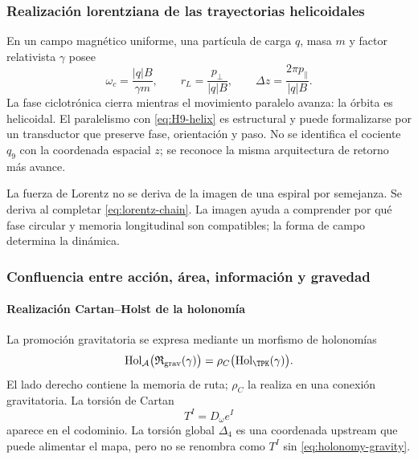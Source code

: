 \subsubsection{Realización lorentziana de las trayectorias helicoidales}

En un campo magnético uniforme, una partícula de carga \(q\), masa \(m\) y
factor relativista \(\gamma\) posee
\begin{equation}
\omega_c=\frac{|q|B}{\gamma m},
\qquad
r_L=\frac{p_\perp}{|q|B},
\qquad
\Delta z=\frac{2\pi p_\parallel}{|q|B}.
\label{eq:lorentz-helix}
\end{equation}
La fase ciclotrónica cierra mientras el movimiento paralelo avanza: la órbita
es helicoidal. El paralelismo con \eqref{eq:H9-helix} es estructural y puede
formalizarse por un transductor que preserve fase, orientación y paso. No se
identifica el cociente \(q_9\) con la coordenada espacial \(z\); se reconoce
la misma arquitectura de retorno más avance.

La fuerza de Lorentz no se deriva de la imagen de una espiral por semejanza.
Se deriva al completar \eqref{eq:lorentz-chain}. La imagen ayuda a comprender
por qué fase circular y memoria longitudinal son compatibles; la forma de
campo determina la dinámica.

\subsubsection{Confluencia entre acción, área, información y gravedad}

\paragraph{Realización Cartan--Holst de la holonomía}

La promoción gravitatoria se expresa mediante un morfismo de holonomías
\begin{equation}
\operatorname{Hol}_{\mathcal A}
\bigl(\mathfrak R_{\mathrm{grav}}(\gamma)\bigr)
=\rho_C\bigl(\operatorname{Hol}_{\TPK}(\gamma)\bigr).
\label{eq:holonomy-gravity}
\end{equation}
El lado derecho contiene la memoria de ruta; \(\rho_C\) la realiza en una
conexión gravitatoria. La torsión de Cartan
\[
T^I=D_\omega e^I
\]
aparece en el codominio. La torsión global \(\Delta_4\) es una coordenada
upstream que puede alimentar el mapa, pero no se renombra como \(T^I\) sin
\eqref{eq:holonomy-gravity}.

